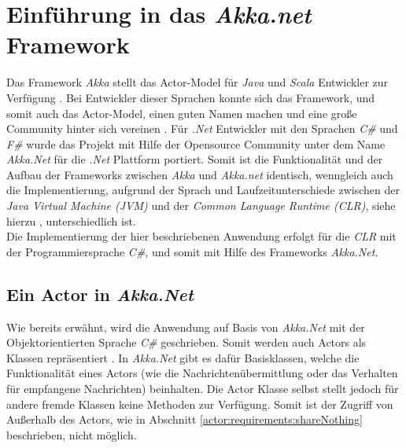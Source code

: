 \section{Einführung in das \textit{Akka.net} Framework}
Das Framework \textit{Akka} stellt das Actor-Model für \textit{Java} und \textit{Scala} Entwickler zur Verfügung \citep{gupta2012akkaEssentiaol}. Bei Entwickler dieser Sprachen konnte sich das Framework, und somit auch das Actor-Model, einen guten Namen machen und eine große Community hinter sich vereinen \citep{Vernon2015ReactiveAkka}. Für \textit{.Net} Entwickler mit den Sprachen \textit{C\#} und \textit{F\#} wurde das Projekt mit Hilfe der Opensource Community unter dem Name \textit{Akka.Net} für die \textit{.Net} Plattform portiert. Somit ist die Funktionalität und der Aufbau der Frameworks zwischen \textit{Akka} und \textit{Akka.net} identisch, wenngleich auch die Implementierung, aufgrund der Sprach und Laufzeitunterschiede zwischen der \textit{Java Virtual Machine (JVM)} und der \textit{Common Language Runtime (CLR)}, siehe hierzu \cite{JvmVsClrsinger2003jvm}, unterschiedlich ist. \\
% 
% 
Die Implementierung der hier beschriebenen Anwendung erfolgt für die \textit{CLR} mit der Programmiersprache \textit{C\#}, und somit mit Hilfe des Frameworks \textit{Akka.Net}. 

\subsection{Ein Actor in \textit{Akka.Net}}
Wie bereits erwähnt, wird die Anwendung auf Basis von \textit{Akka.Net} mit der Objektorientierten Sprache \textit{C\#} geschrieben. Somit werden auch Actors als Klassen repräsentiert \citep{Akka.netCommunityAkka.NETDocumentation}. In \textit{Akka.Net} gibt es dafür Basisklassen, welche die Funktionalität eines Actors (wie die Nachrichtenübermittlung oder das Verhalten für empfangene Nachrichten) beinhalten. Die Actor Klasse selbst stellt jedoch für andere fremde Klassen  keine Methoden zur Verfügung. Somit ist der Zugriff von Außerhalb des Actors, wie in Abschnitt \ref{actor:requirements:shareNothing} beschrieben, nicht möglich. 

